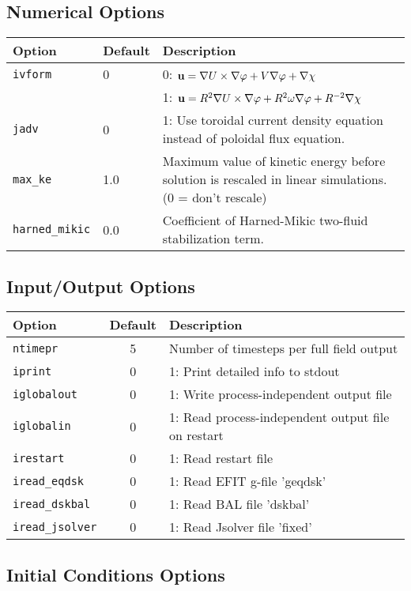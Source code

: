 \subsection{Numerical Options}
\begin{tabular}{llp{3in}}
  \textbf{Option}&\textbf{Default}&\textbf{Description}\\
  \hline
  \texttt{ivform} & 0   & 0: $\mathbf{u} = \nabla U\times\nabla \varphi + V
   \nabla \varphi + \nabla \chi$\\
   & & 1: $\mathbf{u} = R^2 \nabla U\times\nabla \varphi + R^2 \omega
   \nabla \varphi + R^{-2} \nabla \chi$\\
  \texttt{jadv}   & 0   & 1: Use toroidal current density equation
                          instead of poloidal flux equation.\\
  \texttt{max\_ke}& 1.0  & Maximum value of kinetic energy before solution is
                          rescaled in linear simulations. (0 = don't rescale)\\
  \texttt{harned\_mikic} & 0.0 & Coefficient of Harned-Mikic two-fluid
                          stabilization term.\\
\end{tabular}

\subsection{Input/Output Options}

\begin{tabular}{lcp{2.7in}}
  \textbf{Option}&\textbf{Default}&\textbf{Description}\\
  \hline
  \texttt{ntimepr}   & 5 & Number of timesteps per full field output\\
  \texttt{iprint}    & 0 & 1: Print detailed info to stdout\\
  \texttt{iglobalout}& 0 & 1: Write process-independent output file\\
  \texttt{iglobalin} & 0 & 1: Read process-independent output file on restart\\
  \texttt{irestart}  & 0 & 1: Read restart file\\
  \texttt{iread\_eqdsk}   & 0 & 1: Read EFIT g-file 'geqdsk'\\
  \texttt{iread\_dskbal}  & 0 & 1: Read BAL file 'dskbal'\\
  \texttt{iread\_jsolver} & 0 & 1: Read Jsolver file 'fixed'
\end{tabular}


\subsection{Initial Conditions Options}

